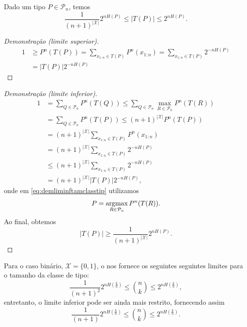 \begin{theorem}\label{thm:limtamclasstip}
Dado um tipo $P \in \mathcal{P}_n$, temos
\begin{equation}\label{eq:limtamclasstip}
\frac{1}{(n+1)^{\vert \mathcal{X} \vert}} 2^{nH(P)} \leq \vert T(P) \vert \leq 2^{nH(P)} .
\end{equation}
\end{theorem}
\begin{proof}[Demonstração (limite superior)]
\begin{subequations}
\begin{align}
  1 &\geq P^{n} (T(P)) = \sum_{x_{1:n} \in T(P)} P^{n} (x_{1:n}) = \sum_{x_{1:n} \in T(P)} 2^{-nH(P)} \\
    &= \vert T(P) \vert 2^{-nH(P)}
\end{align}
\end{subequations}
\end{proof}
\begin{proof}[Demonstração (limite inferior)]
\begin{subequations}
\begin{align}
  1 &= \sum_{Q \in \mathcal{P}_n} P^n (T(Q)) \leq \sum_{Q \in \mathcal{P}_n} \max_{R \in \mathcal{P}_n} P^n (T(R)) \\
       &= \sum_{Q \in \mathcal{P}_n} P^n (T(P)) \leq (n+1)^{\vert \mathcal{X} \vert} P^n (T(P)) \label{eq:demliminftamclasstip}\\
      &= (n+1)^{\vert \mathcal{X} \vert} \sum_{x_{1:n} \in T(P)} P^n (x_{1:n}) \\
      &= (n+1)^{\vert \mathcal{X} \vert} \sum_{x_{1:n} \in T(P)} 2^{-nH(P)} \\
      &\leq (n+1)^{\vert \mathcal{X} \vert} \sum_{x_{1:n} \in T(P)} 2^{-nH(P)} \\
      &= (n+1)^{\vert \mathcal{X} \vert} \vert T(P) \vert 2^{-nH(P)} ,
\end{align}
\end{subequations}
onde em \ref{eq:demliminftamclasstip} utilizamos
\begin{equation}
  P = \operatorname*{\arg\!\max}_{R \in \mathcal{P}_n} P^n (T(R)) .
\end{equation}
Ao final, obtemos
\begin{equation}
\vert T(P) \vert \geq \frac{1}{(n+1)^{\vert \mathcal{X} \vert}} 2^{nH(P)} .
\end{equation}
\end{proof}

Para o caso binário, $\mathcal{X} = \{0,1\}$, o 
nos fornece os seguintes seguintes limites para o tamanho da classe de tipo:
\begin{equation}
  \frac{1}{(n+1)^2} 2^{nH(\frac{k}{n})} \leq {n \choose k} \leq 2^{nH(\frac{k}{n})} ,
\end{equation}
entretanto, o limite inferior pode ser ainda mais restrito, fornecendo assim
\begin{equation}
  \frac{1}{(n+1)} 2^{nH(\frac{k}{n})} \leq {n \choose k} \leq 2^{nH(\frac{k}{n})} .
\end{equation}

